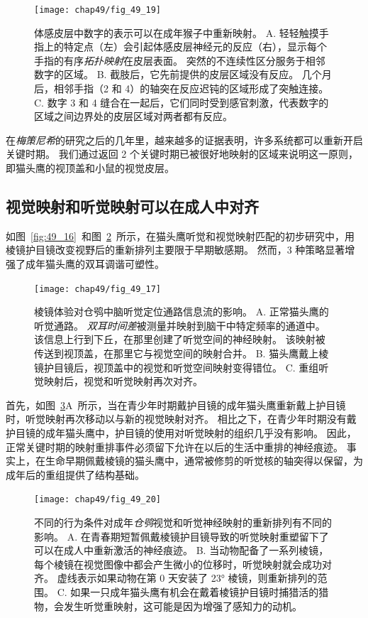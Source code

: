 \begin{figure}[htbp]
	\centering
	\texttt{[image: chap49/fig\_49\_19]}
	\caption{体感皮层中数字的表示可以在成年猴子中重新映射\cite{merzenich1984somatosensory}。
		A. 轻轻触摸手指上的特定点（左）会引起体感皮层神经元的反应（右），显示每个手指的有序\textit{拓扑映射}在皮层表面。
		突然的不连续性区分服务于相邻数字的区域。
		B. 截肢后，它先前提供的皮层区域没有反应。
		几个月后，相邻手指（2 和 4）的轴突在反应迟钝的区域形成了突触连接。
		C. 数字 3 和 4 缝合在一起后，它们同时受到感官刺激，代表数字的区域之间边界处的皮层区域对两者都有反应。}
	\label{fig:49_19}
\end{figure}


在\textit{梅策尼希}的研究之后的几年里，越来越多的证据表明，许多系统都可以重新开启关键时期。
我们通过返回 2 个关键时期已被很好地映射的区域来说明这一原则，即猫头鹰的视顶盖和小鼠的视觉皮层。



\subsection{视觉映射和听觉映射可以在成人中对齐}

如图~\ref{fig:49_16}~和图~\ref{fig:49_17}~所示，在猫头鹰听觉和视觉映射匹配的初步研究中，用棱镜护目镜改变视野后的重新排列主要限于早期敏感期。
然而，3 种策略显著增强了成年猫头鹰的双耳调谐可塑性。

\begin{figure}[htbp]
	\centering
	\texttt{[image: chap49/fig\_49\_17]}
	\caption{棱镜体验对仓鸮中脑听觉定位通路信息流的影响\cite{knudsen2002instructed}。
		A. 正常猫头鹰的听觉通路。
		\textit{双耳时间差}被测量并映射到脑干中特定频率的通道中。
		该信息上行到下丘，在那里创建了听觉空间的神经映射。
		该映射被传送到视顶盖，在那里它与视觉空间的映射合并。
		B. 猫头鹰戴上棱镜护目镜后，视顶盖中的视觉和听觉空间映射变得错位。
		C. 重组听觉映射后，视觉和听觉映射再次对齐。}
	\label{fig:49_17}
\end{figure}


首先，如图~\ref{fig:49_20}A~所示，当在青少年时期戴护目镜的成年猫头鹰重新戴上护目镜时，听觉映射再次移动以与新的视觉映射对齐。
相比之下，在青少年时期没有戴护目镜的成年猫头鹰中，护目镜的使用对听觉映射的组织几乎没有影响。
因此，正常关键时期的映射重排事件必须留下允许在以后的生活中重排的神经痕迹。
事实上，在生命早期佩戴棱镜的猫头鹰中，通常被修剪的听觉核的轴突得以保留，为成年后的重组提供了结构基础。

\begin{figure}[htbp]
	\centering
	\texttt{[image: chap49/fig\_49\_20]}
	\caption{不同的行为条件对成年\textit{仓鸮}视觉和听觉神经映射的重新排列有不同的影响。
		A. 在青春期短暂佩戴棱镜护目镜导致的听觉映射重塑留下了可以在成人中重新激活的神经痕迹。
		B. 当动物配备了一系列棱镜，每个棱镜在视觉图像中都会产生微小的位移时，听觉映射就会成功对齐。
		虚线表示如果动物在第 0 天安装了 23° 棱镜，则重新排列的范围。
		C. 如果一只成年猫头鹰有机会在戴着棱镜护目镜时捕猎活的猎物，会发生听觉重映射，这可能是因为增强了感知力的动机。}
	\label{fig:49_20}
\end{figure}


